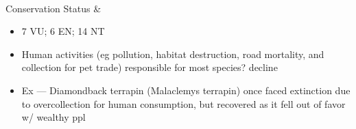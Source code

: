 \begin{center}
\begin{longtabu}
	\\
	\hline
	Conservation Status & 
	\begin{itemize}[noitemsep]
		\item 7 VU; 6 EN; 14 NT
		\item Human activities (eg pollution, habitat destruction, road mortality, and collection for pet trade) responsible for most species? decline
		\item Ex --- Diamondback terrapin (Malaclemys terrapin) once faced extinction due to overcollection for human consumption, but recovered as it fell out of favor w/ wealthy ppl
	\end{itemize}
	\\
	\hline
\end{longtabu}
\end{center}